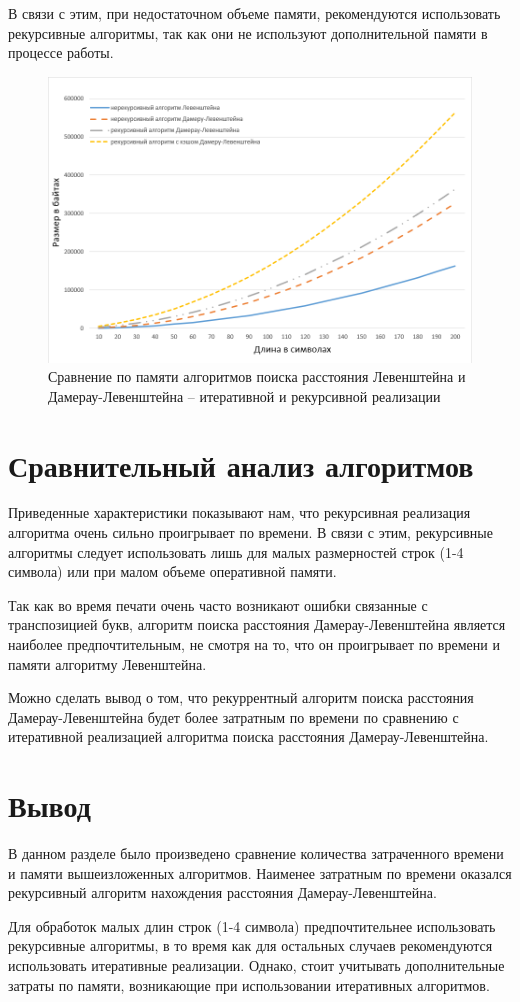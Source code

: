 В связи с этим, при недостаточном объеме памяти, рекомендуются использовать рекурсивные алгоритмы, так как они не используют дополнительной памяти в процессе работы.

\clearpage

\begin{figure}[h]
	\centering
	\includegraphics[height=0.3\textheight]{img/diag_03.png}
	\caption{Сравнение по памяти алгоритмов поиска расстояния Левенштейна и Дамерау-Левенштейна -- итеративной и рекурсивной реализации}
	\label{plt:memory}
\end{figure}

\section{Сравнительный анализ алгоритмов}
Приведенные характеристики показывают нам, что рекурсивная реализация алгоритма очень сильно проигрывает по времени. В связи с этим, рекурсивные алгоритмы следует использовать лишь для малых размерностей строк (1-4 символа) или при малом объеме оперативной памяти.

Так как во время печати очень часто возникают ошибки связанные с транспозицией букв, алгоритм поиска расстояния Дамерау-Левенштейна является наиболее предпочтительным, не смотря на то, что он проигрывает по времени и памяти алгоритму Левенштейна.

Можно сделать вывод о том, что рекуррентный алгоритм поиска расстояния Дамерау-Левенштейна будет более затратным по времени по сравнению с итеративной реализацией алгоритма поиска расстояния Дамерау-Левенштейна.

\section{Вывод}
В данном разделе было произведено сравнение количества затраченного времени и памяти вышеизложенных алгоритмов. Наименее затратным по времени оказался рекурсивный алгоритм нахождения расстояния Дамерау-Левенштейна.

Для обработок малых длин строк (1-4 символа) предпочтительнее использовать рекурсивные алгоритмы, в то время как для остальных случаев рекомендуются использовать итеративные реализации. Однако, стоит учитывать дополнительные затраты по памяти, возникающие при использовании итеративных алгоритмов.